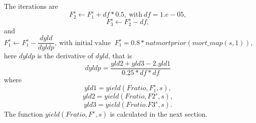 \documentclass{article}
\begin{document}
    The iterations are
    \begin{equation}
        F_2^s \leftarrow F_1^s + df*0.5, \ \text{with}  \ df=1.e-05,
    \end{equation}
    \begin{equation}
        F_3^s\leftarrow F_2^s-df,
    \end{equation}
and
\begin{equation}
    F_1^s\leftarrow F_1^s-\dfrac{dyld}{dyldp}, \ \text{with initial value } \ F_1^s=0.8*natmortprior(mort\_map(s,1)),
\end{equation}
    here $dyldp$ is the derivative of $dyld$, that is
\begin{equation}
    dyldp=\dfrac{yld2+yld3 - 2.yld1}{0.25*df*df}
\end{equation}
where
\begin{equation}
    yld1=yield(Fratio,F_1^s,s),
\end{equation}
\begin{equation}
    yld2=yield(Fratio,F2^s,s),
\end{equation}
\begin{equation}
    yld3=yield(Fratio.F3^s,s).
\end{equation}
The function $yield(Fratio,F^s,s)$ is calculated in the next section.\\
\end{document}
